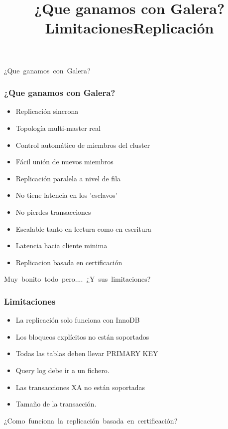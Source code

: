 \documentclass[UTF8]{beamer}
\begin{document}
\title[¿Que ganamos?]{¿Que ganamos con Galera?}
\begin{frame}
	\centering
	\mbox{¿Que ganamos con Galera?}	
\end{frame}


\begin{frame}
	\frametitle{¿Que ganamos con Galera?}
	\begin{itemize}
		\item Replicación sincrona
		\pause
		\item Topología multi-master real
		\pause
		\item Control automático de miembros del cluster
		\pause
		\item Fácil unión de nuevos miembros
		\pause
		\item Replicación paralela a nivel de fila
		\pause
		\item No tiene latencia en los 'esclavos'
		\pause
		\item No pierdes transacciones
		\pause
		\item Escalable tanto en lectura como en escritura
		\pause
		\item Latencia hacia cliente minima
		\pause
		\item Replicacion basada en certificación
	\end{itemize}
\end{frame}


\title[Limitaciones]{Limitaciones}
\begin{frame}
	\centering
	\mbox{Muy bonito todo pero.... ¿Y sus limitaciones?}	
\end{frame}


\begin{frame}
	\frametitle[Limitaciones]{Limitaciones}
	\begin{itemize}
		\item La replicación solo funciona con InnoDB
		\pause
		\item Los bloqueos explícitos no están soportados
		\pause
		\item Todas las tablas deben llevar PRIMARY KEY
		\pause
		\item Query log debe ir a un fichero.
		\pause
		\item Las transacciones XA no están soportadas
		\pause
		\item Tamaño de la transacción.
	\end{itemize}
\end{frame}


\title[Replicación]{Replicación}
\begin{frame}
	\centering
	\mbox{¿Como funciona la replicación basada en certificación?}	
\end{frame}
\end{document}
